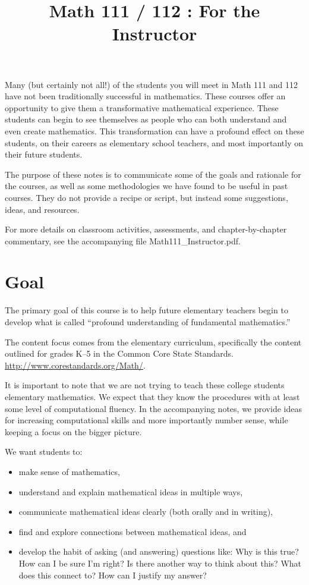 \documentclass[12pt, reqno]{amsart}
\title{Math 111 / 112 :  For the Instructor}
\theoremstyle{remark}
\theoremstyle{definition}
\numberwithin{equation}{section}  %
\begin{document}
\maketitle

Many (but certainly not all!) of the students you will meet in Math 111 and 112 have not been traditionally successful in mathematics.  These courses offer an opportunity to give them a transformative mathematical experience.  These students can begin to see themselves as people who can both understand and even create mathematics.  This transformation can have a profound effect on these students, on their careers as elementary school teachers, and most importantly on their future students.  

The purpose of these notes is to communicate some of the goals and rationale for the courses, as well as some  methodologies we have found to be useful in past courses.  They do not provide a recipe or script, but instead some suggestions, ideas, and resources.

For more details on classroom activities, assessments, and chapter-by-chapter commentary, see the accompanying  file Math111\_Instructor.pdf.


\section{Goal} 
The primary goal of this course is to help future elementary teachers begin to develop what is called ``profound understanding of fundamental mathematics.''

The content focus comes from the elementary curriculum, specifically the content outlined for grades K--5 in the Common Core State Standards.  \url{http://www.corestandards.org/Math/}.

It is important to note that we are not trying to teach these college students elementary mathematics.  We expect that they know the procedures with at least some level of computational fluency.  In the accompanying notes, we provide ideas for increasing computational skills and more importantly number sense, while keeping a focus on the bigger picture.  

We want students to:
\begin{itemize}
\item
make sense of mathematics,
\item
understand and explain mathematical ideas in multiple ways,
\item
communicate mathematical ideas clearly (both orally and in writing),
\item
find and explore connections between mathematical ideas, and
\item
develop the habit of asking (and answering) questions like: Why is this true? How can I be sure I'm right?  Is there another way to think about this?  What does this connect to?  How can I justify my answer?
\end{itemize}
\end{document}
